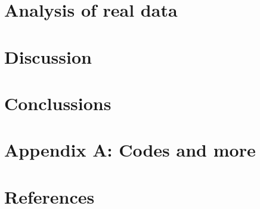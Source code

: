 \documentclass[11pt, letterpaper, titlepage]{article}
\begin{document}
\section{Analysis of real data}

\section*{Discussion}
\section*{Conclussions}

\section*{Appendix A: Codes and more}

\bigskip
\section*{References}
\end{document}
